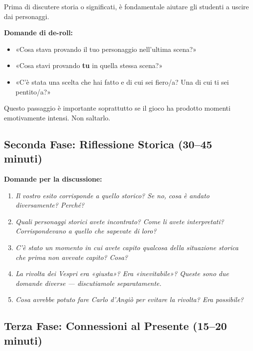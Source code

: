 Prima di discutere storia o significati, è fondamentale aiutare
gli studenti a uscire dai personaggi.

\textbf{Domande di de-roll:}
\begin{itemize}[nosep]
  \item «Cosa stava provando il tuo personaggio nell'ultima scena?»
  \item «Cosa stavi provando \textbf{tu} in quella stessa scena?»
  \item «C'è stata una scelta che hai fatto e di cui sei
    fiero/a? Una di cui ti sei pentito/a?»
\end{itemize}

Questo passaggio è importante soprattutto se il gioco ha prodotto
momenti emotivamente intensi. Non saltarlo.

\subsection{Seconda Fase: Riflessione Storica (30--45 minuti)}

\textbf{Domande per la discussione:}

\begin{enumerate}
  \item \textit{Il vostro esito corrisponde a quello storico?
    Se no, cosa è andato diversamente? Perché?}

  \item \textit{Quali personaggi storici avete incontrato?
    Come li avete interpretati? Corrispondevano a quello
    che sapevate di loro?}

  \item \textit{C'è stato un momento in cui avete capito
    qualcosa della situazione storica che prima non
    avevate capito? Cosa?}

  \item \textit{La rivolta dei Vespri era «giusta»?
    Era «inevitabile»? Queste sono due domande diverse —
    discutiamole separatamente.}

  \item \textit{Cosa avrebbe potuto fare Carlo d'Angiò
    per evitare la rivolta? Era possibile?}
\end{enumerate}

\subsection{Terza Fase: Connessioni al Presente (15--20 minuti)}

